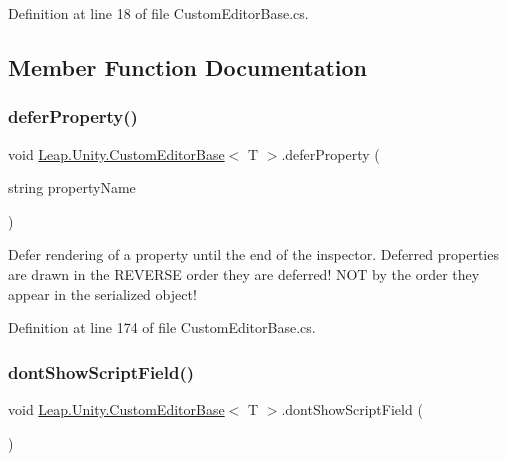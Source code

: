 Definition at line 18 of file Custom\+Editor\+Base.\+cs.



\subsection{Member Function Documentation}
\mbox{\label{class_leap_1_1_unity_1_1_custom_editor_base_a1f7e4b6641ca944bac1efc1679a40afd}} 
\subsubsection{\texorpdfstring{deferProperty()}{deferProperty()}}
{\footnotesize\ttfamily void \mbox{\hyperlink{class_leap_1_1_unity_1_1_custom_editor_base}{Leap.\+Unity.\+Custom\+Editor\+Base}}$<$ T $>$.defer\+Property (\begin{DoxyParamCaption}\item[{string}]{property\+Name }\end{DoxyParamCaption})\hspace{0.3cm}{\ttfamily [protected]}}



Defer rendering of a property until the end of the inspector. Deferred properties are drawn in the R\+E\+V\+E\+R\+SE order they are deferred! N\+OT by the order they appear in the serialized object! 



Definition at line 174 of file Custom\+Editor\+Base.\+cs.

\mbox{\label{class_leap_1_1_unity_1_1_custom_editor_base_a08ac3b5610a14389384b3db0f8612b42}} 
\subsubsection{\texorpdfstring{dontShowScriptField()}{dontShowScriptField()}}
{\footnotesize\ttfamily void \mbox{\hyperlink{class_leap_1_1_unity_1_1_custom_editor_base}{Leap.\+Unity.\+Custom\+Editor\+Base}}$<$ T $>$.dont\+Show\+Script\+Field (\begin{DoxyParamCaption}{ }\end{DoxyParamCaption})\hspace{0.3cm}{\ttfamily [protected]}}



